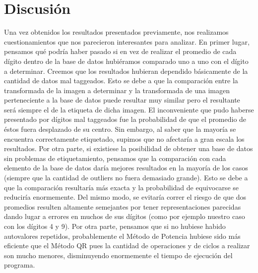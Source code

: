 \documentclass[10pt, a4paper]{article}
\begin{document}
\section{Discusi\'on}
Una vez obtenidos los resultados presentados previamente, nos realizamos cuestionamientos que nos parecieron interesantes para analizar. En primer lugar, pensamos qué podría haber pasado si en vez de realizar el promedio de cada dígito dentro de la base de datos hubiéramos comparado uno a uno con el dígito a determinar. Creemos que los resultados hubieran dependido básicamente de la cantidad de datos mal taggeados. Esto se debe a que la comparación entre la transformada de la imagen a determinar y la transformada de una imagen perteneciente a la base de datos puede resultar muy similar pero el resultante será siempre el de la etiqueta de dicha imagen. El inconveniente que pudo haberse presentado por dígitos mal taggeados fue la probabilidad de que el promedio de éstos fuera desplazado de su centro. Sin embargo, al saber que la mayoría se encuentra correctamente etiquetado, supimos que no afectaría a gran escala los resultados. Por otra parte, si existiese la posibilidad de obtener una base de datos sin problemas de etiquetamiento, pensamos que la comparación con cada elemento de la base de datos daría mejores resultados en la mayoría de los casos (siempre que la cantidad de outliers no fuera demasiado grande). Esto se debe a que la comparación resultaría más exacta y la probabilidad de equivocarse se reduciría enormemente. Del mismo modo, se evitaría correr el riesgo de que dos promedios resulten altamente semejantes por tener representaciones parecidas dando lugar a errores en muchos de sus dígitos (como por ejemplo nuestro caso con los dígitos 4 y 9).\newline
\newline
Por otra parte, pensamos que si no hubiese habido autovalores repetidos, probablemente el Método de Potencia hubiese sido más eficiente que el Método QR pues la cantidad de operaciones y de ciclos a realizar son mucho menores, disminuyendo enormemente el tiempo de ejecución del programa.
\end{document}
